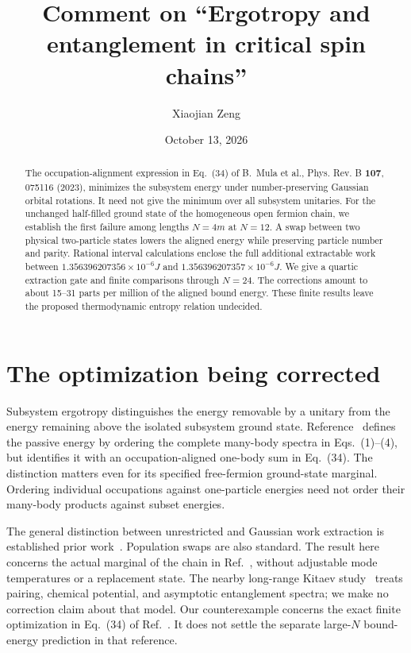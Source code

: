 \documentclass[aps,prb,reprint,amsmath,amssymb,longbibliography,floatfix]{revtex4-2}
\begin{document}
\title{Comment on ``Ergotropy and entanglement in critical spin chains''}
\author{Xiaojian Zeng}
\date{October 13, 2026}
\begin{abstract}
The occupation-alignment expression in Eq.~(34) of B.~Mula et al.,
Phys. Rev. B \textbf{107}, 075116 (2023), minimizes the subsystem energy under
number-preserving Gaussian orbital rotations. It need not give the minimum
over all subsystem unitaries. For the unchanged half-filled ground state of
the homogeneous open fermion chain, we establish the first failure among
lengths $N=4m$ at $N=12$. A swap between two physical two-particle states
lowers the aligned energy while preserving particle number and parity.
Rational interval calculations enclose the full additional extractable work
between $1.356396207356\times10^{-6}J$ and
$1.356396207357\times10^{-6}J$. We give a quartic extraction gate and finite
comparisons through $N=24$. The corrections amount to about 15--31 parts per
million of the aligned bound energy. These finite results leave the proposed
thermodynamic entropy relation undecided.
\end{abstract}
\maketitle

\section{The optimization being corrected}
Subsystem ergotropy distinguishes the energy removable by a unitary from the
energy remaining above the isolated subsystem ground state. Reference~\cite{Mula2023}
defines the passive energy by ordering the complete many-body spectra in
Eqs.~(1)--(4), but identifies it with an occupation-aligned one-body sum in
Eq.~(34). The distinction matters even for its specified free-fermion
ground-state marginal. Ordering individual occupations against one-particle
energies need not order their many-body products against subset energies.

The general distinction between unrestricted and Gaussian work extraction is
established prior work~\cite{OnumaKalu2018}. Population swaps are also standard.
The result here concerns the actual marginal of the chain in
Ref.~\cite{Mula2023}, without adjustable mode temperatures or a replacement
state. The nearby long-range Kitaev study~\cite{Mitra2025} treats pairing,
chemical potential, and asymptotic entanglement spectra; we make no correction
claim about that model. Our counterexample concerns the exact finite
optimization in Eq.~(34) of Ref.~\cite{Mula2023}. It does not settle the separate
large-$N$ bound-energy prediction in that reference.
\end{document}
